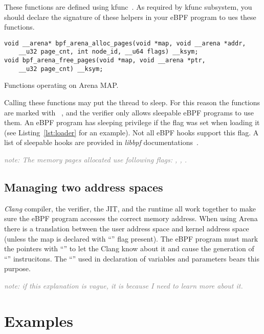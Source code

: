 \documentclass{article}
\begin{document}
These functions are defined using kfunc~\cite{eunomia_kfunc, ebpf_docs_kfunc}.
As required by kfunc subsystem, you should declare the signature of these
helpers in your eBPF program to ues these functions.
\begin{listing}
\begin{verbatim}
void __arena* bpf_arena_alloc_pages(void *map, void __arena *addr,
    __u32 page_cnt, int node_id, __u64 flags) __ksym;
void bpf_arena_free_pages(void *map, void __arena *ptr,
    __u32 page_cnt) __ksym;
\end{verbatim}
\caption{Functions operating on Arena MAP.}
\label{lst:arena_kfuncs}
\end{listing}

Calling these functions may put the thread to sleep. For this reason the
functions are marked with ~\cite{arena_source}, and the
verifier only allows sleepable eBPF programs to use them. An eBPF program has
sleeping privilege if the  flag was set when loading it
(see Listing~\ref{lst:loader} for an example).
Not all eBPF hooks support this flag. A list of sleepable
hooks are provided in \emph{libbpf} documentations~\cite{libbpf_sleepable}.

\textcolor{gray}{\emph{note: The memory pages allocated use following flags:
, , .}}

\subsection{Managing two address spaces}

\emph{Clang} compiler, the verifier, the JIT, and the runtime all work together
to make sure the eBPF program accesses the correct memory address. When using
Arena there is a translation between the user address space and kernel address
space (unless the map is declared with ``'' flag
present). The eBPF program must mark the pointers with
``'' to let the Clang know about it and
cause the generation of ``'' instrucitons. The
``'' used in declaration of variables and parameters bears this
purpose.

\textcolor{gray}{\emph{note: if this explanation is vague, it is because I need
to learn more about it.}}


\section{Examples}
\end{document}
